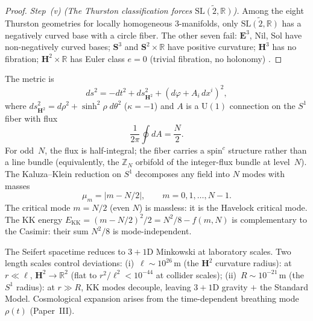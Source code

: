 \begin{proof}
\emph{Step~(v) (The Thurston classification forces
$\widetilde{\mathrm{SL}(2,\mathbb{R})}$).}
Among the eight Thurston geometries for locally homogeneous
$3$-manifolds, only $\widetilde{\mathrm{SL}(2,\mathbb{R})}$ has a
negatively curved base with a circle fiber.
The other seven fail:
$\mathbf{E}^3$, Nil, Sol have non-negatively curved bases;
$\mathbf{S}^3$ and $\mathbf{S}^2 \times \mathbb{R}$ have positive
curvature;
$\mathbf{H}^3$ has no fibration;
$\mathbf{H}^2 \times \mathbb{R}$ has Euler class $e = 0$
(trivial fibration, no holonomy) \citep{Thurston1982}.
\end{proof}

\noindent
The metric is
\begin{equation}\label{eq:metric-4d}
  ds^2 = -dt^2 + ds^2_{\mathbf{H}^2}
  + (d\varphi + A_i\,dx^i)^2,
\end{equation}
where $ds^2_{\mathbf{H}^2} = d\rho^2 + \sinh^2\!\rho\;d\theta^2$
($\kappa = -1$) and $A$ is a $\mathrm{U}(1)$ connection on the $S^1$ fiber
with flux
\begin{equation}\label{eq:flux}
  \frac{1}{2\pi}\oint dA = \frac{N}{2}.
\end{equation}
For odd~$N$, the flux is half-integral; the fiber carries a
$\mathrm{spin}^c$ structure rather than a line bundle
(equivalently, the $\mathbb{Z}_N$ orbifold of
the integer-flux bundle at level~$N$).
The Kaluza--Klein reduction on $S^1$ decomposes any field into
$N$ modes with masses
\begin{equation}\label{eq:kk-masses}
  \mu_m = |m - N/2|, \qquad m = 0, 1, \ldots, N{-}1.
\end{equation}
The critical mode $m = N/2$ (even $N$) is massless: it is the
Havelock critical mode.
The KK energy $E_{\mathrm{KK}} = (m{-}N/2)^2/2 = N^2/8 - f(m,N)$
is complementary to the Casimir: their sum $N^2/8$ is
mode-independent.

\begin{remark}
\label{rem:minkowski}
The Seifert spacetime reduces to $3{+}1$D Minkowski at
laboratory scales.  Two length scales control deviations:
(i)~$\ell \sim 10^{26}\,$m (the $\mathbf{H}^2$ curvature radius):
at $r \ll \ell$, $\mathbf{H}^2 \to \mathbb{R}^2$
(flat to $r^2/\ell^2 < 10^{-44}$ at collider scales);
(ii)~$R \sim 10^{-21}\,$m (the $S^1$ radius):
at $r \gg R$, KK modes decouple,
leaving $3{+}1$D gravity $+$ the Standard Model.
Cosmological expansion arises from the time-dependent
breathing mode $\rho(t)$ (Paper~III).
\end{remark}


